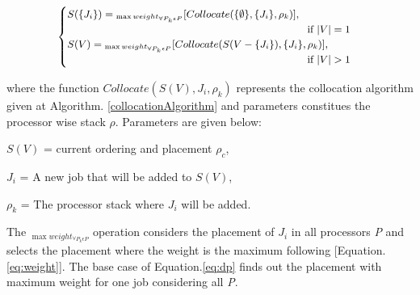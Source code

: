 \begin{equation}
\small
\begin{cases}
    S(\{J_i\}) = {}_{\max weight_{\forall P_k \epsilon P}}[Collocate(\{\emptyset\},\{J_i\}, \rho_k)],	\\ 
    \quad  \quad  \quad \quad \quad \quad\quad \quad  \quad  \quad \quad \quad \quad\quad  \quad  \quad \quad \quad 
    \quad  \quad \quad \quad \quad  \text{if } {|V|=1}\\
    S(V) = {}_{\max weight_{\forall P_k \epsilon P}}[Collocate(S(V - \{J_i\}),\{J_i\}, \rho_k)], \\			
    \quad  \quad  \quad \quad \quad \quad\quad \quad  \quad  \quad \quad \quad \quad\quad  \quad  \quad \quad \quad 
    \quad  \quad \quad \quad \quad  \text{if } {|V|>1}\\
\end{cases}
\label{eq:dp}
\end{equation}

where the function ${Collocate(S(V),J_i,\rho_k)}$ represents the collocation algorithm given at Algorithm.
\ref{collocationAlgorithm} and parameters constitues the processor wise stack $\rho$. Parameters are given below:

\begin{description}
        \item \quad $S(V)$ = current ordering and placement $\rho_c$,
        \item \quad $J_i$ = A new job that will be added to $S(V)$,
        \item \quad $\rho_k$ = The processor stack where $J_i$ will be added.
\end{description}

The ${}_{\max weight_{\forall P_k \epsilon P}}$ operation considers the placement of $J_i$ in all processors \emph{P} and
selects the placement where the weight is the maximum following [Equation.\ref{eq:weight}]. The base case
of Equation.\ref{eq:dp} finds out the placement with maximum weight for one job considering all \emph{P}.


